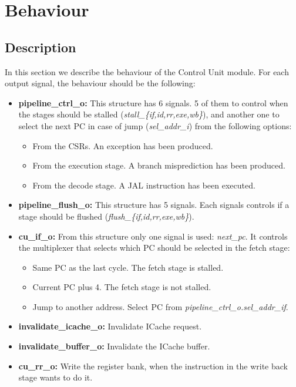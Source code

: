 \section{Behaviour}

\subsection{Description}

In this section we describe the behaviour of the Control Unit module.
For each output signal, the behaviour should be the following:

\begin{itemize}
    \item \textbf{pipeline\_ctrl\_o:} This structure has 6 signals. 5 of them to control when the stages should be stalled (\textit{stall\_\{if,id,rr,exe,wb\}}), and another one to select the next PC in case of jump (\textit{sel\_addr\_i}) from the following options:
    \begin{itemize}
        \item From the CSRs. An exception has been produced.
        \item From the execution stage. A branch misprediction has been produced.
        \item From the decode stage. A JAL instruction has been executed.
    \end{itemize}
    \item \textbf{pipeline\_flush\_o:} This structure has 5 signals. Each signals controls if a stage should be flushed (\textit{flush\_\{if,id,rr,exe,wb\}}).
    \item \textbf{cu\_if\_o:} From this structure only one signal is used: \textit{next\_pc}. It controls the multiplexer that selects which PC should be selected in the fetch stage:
    \begin{itemize}
        \item Same PC as the last cycle. The fetch stage is stalled.
        \item Current PC plus 4. The fetch stage is not stalled.
        \item Jump to another address. Select PC from \textit{pipeline\_ctrl\_o.sel\_addr\_if}.
    \end{itemize}
    \item \textbf{invalidate\_icache\_o:} Invalidate ICache request.
    \item \textbf{invalidate\_buffer\_o:} Invalidate the ICache buffer.
    \item \textbf{cu\_rr\_o:} Write the register bank, when the instruction in the write back stage wants to do it.
\end{itemize}